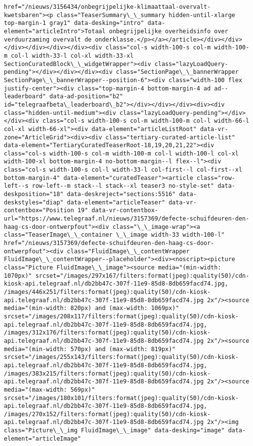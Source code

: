 \documentclass[11pt]{article}
\begin{document}
\begin{Verbatim}[commandchars=\\\{\}]
href="/nieuws/3156434/onbegrijpelijke-klimaattaal-overvalt-kwetsbaren"><p class="TeaserSummary\_\_summary hidden-until-xlarge top-margin-1 gray1" data-desking="intro" data-element="articleIntro">Totaal onbegrijpelijke overheidsinfo over verduurzaming overvalt de onderklasse.</p></a></article></div></div></div></div></div></div><div class="col-s width-100-s col-m width-100-m col-l width-33-l col-xl width-33-xl SectionCuratedBlock\_\_widgetWrapper"><div class="lazyLoadQuery-pending"></div></div></div><div class="SectionPage\_\_bannerWrapper SectionPage\_\_bannerWrapper--position-6"><div class="width-100 flex justify-center"><div class="top-margin-4 bottom-margin-4 ad ad--leaderboard" data-ad-position="b2" id="telegraafbeta\_leaderboard\_b2"></div></div></div><div><div class="hidden-until-medium"><div class="lazyLoadQuery-pending"></div></div><div class="col-s width-100-s col-m width-100-m col-l width-66-l col-xl width-66-xl"><div data-element="articleListRoot" data-vr-zone="ArticleGrid"><div><div class="tertiary-curated-article-list" data-element="TertiaryCuratedTeaserRoot-18,19,20,21,22"><div class="col-s width-100-s col-m width-100-m col-l width-100-l col-xl width-100-xl bottom-margin-4 no-bottom-margin--l flex--l"><div class="col-s width-100-s col-l width-33-l col-first--l col-first--xl bottom-margin-4" data-element="curatedTeaser"><article class="row-left--s row-left--m stack--l stack--xl teaser3 no-style-set" data-deskposition="18" data-deskreject="sections:5516" data-deskstyles="diap" data-element="articleTeaser" data-vr-contentbox="Position 19" data-vr-contentbox-url="https://www.telegraaf.nl/nieuws/3157369/defecte-schuifdeuren-den-haag-cs-door-ontwerpfout"><div class="\_\_image-wrap"><a class="TeaserImage\_\_container \_\_image width-33 width-100-l" href="/nieuws/3157369/defecte-schuifdeuren-den-haag-cs-door-ontwerpfout"><div class="FluidImage\_\_contentWrapper FluidImage\_\_contentWrapper--placeholder"><div><noscript><picture class="Picture FluidImage\_\_image"><source media="(min-width: 1070px)" srcset="/images/297x167/filters:format(jpeg):quality(50)/cdn-kiosk-api.telegraaf.nl/db2bb47c-307f-11e9-85d8-8db659facd74.jpg, /images/446x251/filters:format(jpeg):quality(50)/cdn-kiosk-api.telegraaf.nl/db2bb47c-307f-11e9-85d8-8db659facd74.jpg 2x"/><source media="(min-width: 820px) and (max-width: 1069px)" srcset="/images/208x117/filters:format(jpeg):quality(50)/cdn-kiosk-api.telegraaf.nl/db2bb47c-307f-11e9-85d8-8db659facd74.jpg, /images/312x176/filters:format(jpeg):quality(50)/cdn-kiosk-api.telegraaf.nl/db2bb47c-307f-11e9-85d8-8db659facd74.jpg 2x"/><source media="(min-width: 570px) and (max-width: 819px)" srcset="/images/255x143/filters:format(jpeg):quality(50)/cdn-kiosk-api.telegraaf.nl/db2bb47c-307f-11e9-85d8-8db659facd74.jpg, /images/383x215/filters:format(jpeg):quality(50)/cdn-kiosk-api.telegraaf.nl/db2bb47c-307f-11e9-85d8-8db659facd74.jpg 2x"/><source media="(max-width: 569px)" srcset="/images/180x101/filters:format(jpeg):quality(50)/cdn-kiosk-api.telegraaf.nl/db2bb47c-307f-11e9-85d8-8db659facd74.jpg, /images/270x152/filters:format(jpeg):quality(50)/cdn-kiosk-api.telegraaf.nl/db2bb47c-307f-11e9-85d8-8db659facd74.jpg 2x"/><img class="Picture\_\_img FluidImage\_\_image" data-desking="image" data-element="articleImage" 
\end{Verbatim}
\end{document}
